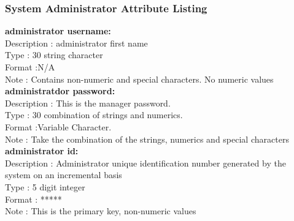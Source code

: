 \documentclass[12pt]{article}
\begin{document}
\subsubsection{System Administrator Attribute Listing}
\textbf {administrator username:}\\
Description : administrator first name\\
Type : 30 string character \\
Format :N/A \\
Note : Contains non-numeric and special characters. No numeric values\\

\textbf {administratdor password:}\\
Description : This is the manager password.\\
Type : 30 combination of strings and numerics. \\
Format :Variable Character. \\
Note : Take the combination of the strings, numerics and special characters\\

\textbf {administrator id:}\\
Description : Administrator unique identification number generated by the system on an incremental basis\\
Type : 5 digit integer \\
Format : ***** \\
Note : This is the primary key, non-numeric values
\end{document}
